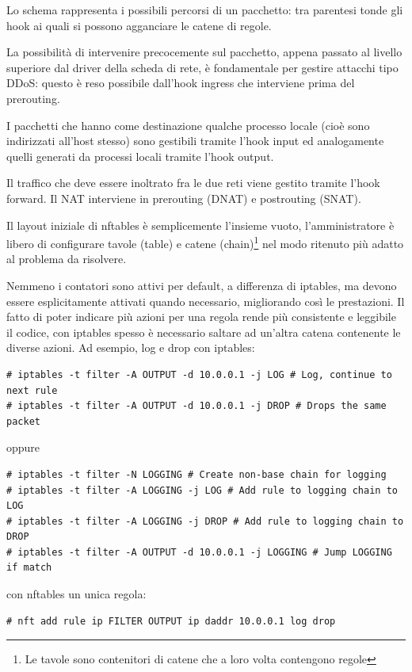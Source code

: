 Lo schema rappresenta i possibili percorsi di un pacchetto: tra parentesi tonde
gli hook ai quali si possono agganciare le catene di regole.

La possibilit\`a di intervenire precocemente sul pacchetto, appena passato al
livello superiore dal driver della scheda di rete, \`e fondamentale per
gestire attacchi tipo DDoS: questo \`e reso possibile dall'hook ingress che
interviene prima del prerouting.

I pacchetti che hanno come destinazione qualche processo locale (cioè sono
indirizzati all'host stesso) sono gestibili tramite l'hook input ed
analogamente quelli generati da processi locali tramite l'hook output.

Il traffico che deve essere inoltrato fra le due reti viene gestito tramite
l'hook forward. Il NAT interviene in prerouting (DNAT) e postrouting (SNAT).

Il layout iniziale di nftables \`e semplicemente l'insieme vuoto,
l'amministratore \`e libero di configurare tavole (table) e catene
(chain)\footnote{Le tavole sono contenitori di catene che a loro volta
contengono regole} nel modo ritenuto pi\`u adatto al problema da risolvere.

Nemmeno i contatori sono attivi per default, a differenza di iptables, ma
devono essere esplicitamente attivati quando necessario, migliorando
cos\`i le prestazioni. Il fatto di poter indicare pi\`u azioni per una regola
rende pi\`u consistente e leggibile il codice, con
iptables spesso è necessario saltare ad un'altra catena contenente le diverse
azioni. Ad esempio, log e drop con iptables:

\begin{lstlisting}
# iptables -t filter -A OUTPUT -d 10.0.0.1 -j LOG # Log, continue to next rule
# iptables -t filter -A OUTPUT -d 10.0.0.1 -j DROP # Drops the same packet
\end{lstlisting}
oppure 
\begin{lstlisting}
# iptables -t filter -N LOGGING # Create non-base chain for logging
# iptables -t filter -A LOGGING -j LOG # Add rule to logging chain to LOG
# iptables -t filter -A LOGGING -j DROP # Add rule to logging chain to DROP
# iptables -t filter -A OUTPUT -d 10.0.0.1 -j LOGGING # Jump LOGGING if match
\end{lstlisting}
\noindent con nftables un unica regola:
\begin{lstlisting}
# nft add rule ip FILTER OUTPUT ip daddr 10.0.0.1 log drop
\end{lstlisting}

